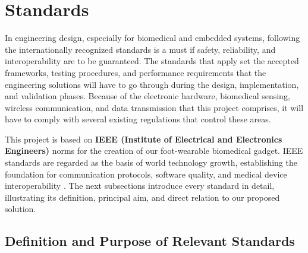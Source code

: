 \section{Standards}

In engineering design, especially for biomedical and embedded systems, following the internationally recognized standards is a must if safety, reliability, and interoperability are to be guaranteed. The standards that apply set the accepted frameworks, testing procedures, and performance requirements that the engineering solutions will have to go through during the design, implementation, and validation phases. Because of the electronic hardware, biomedical sensing, wireless communication, and data transmission that this project comprises, it will have to comply with several existing regulations that control these areas.\\

\vspace{0.05cm}

\noindent This project is based on \textbf{IEEE (Institute of Electrical and Electronics Engineers)} norms for the creation of our foot-wearable biomedical gadget. IEEE standards are regarded as the basis of world technology growth, establishing the foundation for communication protocols, software quality, and medical device interoperability \cite{IEEEStandards2025}. The next subsections introduce every standard in detail, illustrating its definition, principal aim, and direct relation to our proposed solution.\\

\subsection{Definition and Purpose of Relevant Standards}

